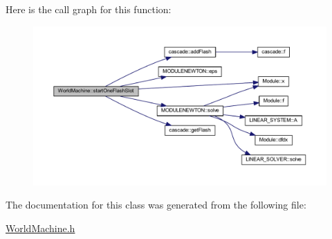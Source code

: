 Here is the call graph for this function\+:
\nopagebreak
\begin{figure}[H]
\begin{center}
\leavevmode
\includegraphics[width=350pt]{class_world_machine_a84f92960f72d17c1a5897072bf203996_cgraph}
\end{center}
\end{figure}


The documentation for this class was generated from the following file\+:\begin{DoxyCompactItemize}
\item 
\mbox{\hyperlink{_world_machine_8h}{World\+Machine.\+h}}\end{DoxyCompactItemize}
